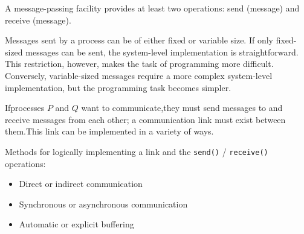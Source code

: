     \par A message-passing facility provides at least two operations: send (message) and receive (message).
    \par Messages sent by a process can be of either fixed or variable size. If only fixed-sized messages can be sent, the system-level implementation is straightforward. This restriction, however, makes the task of programming more difficult. Conversely, variable-sized messages require a more complex system-level implementation, but the programming task becomes simpler.
    \par Ifprocesses $P$ and $Q$ want to communicate,they must send messages to and receive messages from each other; a communication link must exist between them.This link can be implemented in a variety of ways.
    \par Methods for logically implementing a link and the \lstinline{send()} / \lstinline{receive()} operations:
    \begin{itemize}
      \item Direct or indirect communication
      \item Synchronous or asynchronous communication
      \item Automatic or explicit buffering
    \end{itemize}

